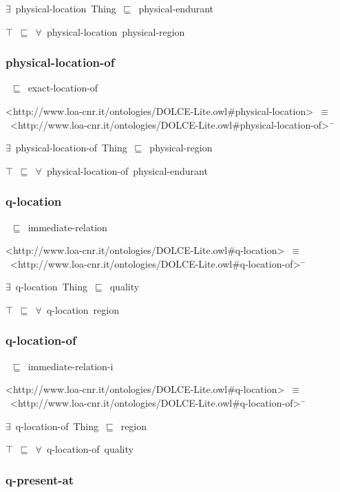 \documentclass{article}
\begin{document}
\ensuremath{\exists}~physical-location~Thing~\ensuremath{\sqsubseteq}~physical-endurant

\ensuremath{\top}~\ensuremath{\sqsubseteq}~\ensuremath{\forall}~physical-location~physical-region

\subsubsection*{physical-location-of}

~\ensuremath{\sqsubseteq}~exact-location-of

<http://www.loa-cnr.it/ontologies/DOLCE-Lite.owl#physical-location>~\ensuremath{\equiv}~<http://www.loa-cnr.it/ontologies/DOLCE-Lite.owl#physical-location-of>\ensuremath{^-}

\ensuremath{\exists}~physical-location-of~Thing~\ensuremath{\sqsubseteq}~physical-region

\ensuremath{\top}~\ensuremath{\sqsubseteq}~\ensuremath{\forall}~physical-location-of~physical-endurant

\subsubsection*{q-location}

~\ensuremath{\sqsubseteq}~immediate-relation

<http://www.loa-cnr.it/ontologies/DOLCE-Lite.owl#q-location>~\ensuremath{\equiv}~<http://www.loa-cnr.it/ontologies/DOLCE-Lite.owl#q-location-of>\ensuremath{^-}

\ensuremath{\exists}~q-location~Thing~\ensuremath{\sqsubseteq}~quality

\ensuremath{\top}~\ensuremath{\sqsubseteq}~\ensuremath{\forall}~q-location~region

\subsubsection*{q-location-of}

~\ensuremath{\sqsubseteq}~immediate-relation-i

<http://www.loa-cnr.it/ontologies/DOLCE-Lite.owl#q-location>~\ensuremath{\equiv}~<http://www.loa-cnr.it/ontologies/DOLCE-Lite.owl#q-location-of>\ensuremath{^-}

\ensuremath{\exists}~q-location-of~Thing~\ensuremath{\sqsubseteq}~region

\ensuremath{\top}~\ensuremath{\sqsubseteq}~\ensuremath{\forall}~q-location-of~quality

\subsubsection*{q-present-at}
\end{document}

